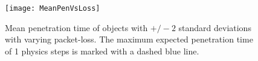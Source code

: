 \begin{figure}
\texttt{[image: MeanPenVsLoss]}
\caption{Mean penetration time of objects with $+/-2$ standard deviations with varying packet-loss. The maximum expected penetration time of 1 physics steps is marked with a dashed blue line.}
\label{fig_CollisionsPenVsLoss}
\end{figure}

%
%
%
%
